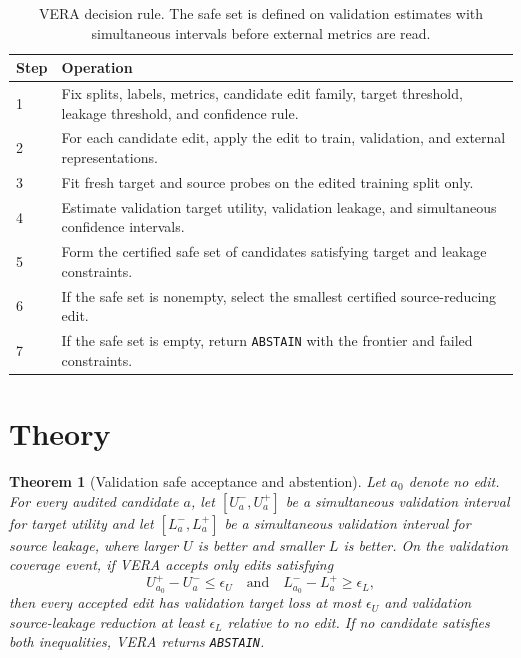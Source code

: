 \documentclass[10pt,twocolumn]{article}
\newtheorem{theorem}{Theorem}
\begin{document}
\begin{table}[t]
\centering
\caption{VERA decision rule. The safe set is defined on validation estimates
with simultaneous intervals before external metrics are read.}
\label{tab:algorithm}
\begin{tabular}{@{}p{}p{}@{}}
\toprule
Step & Operation \\
\midrule
1 & Fix splits, labels, metrics, candidate edit family, target threshold, leakage threshold, and confidence rule. \\
2 & For each candidate edit, apply the edit to train, validation, and external representations. \\
3 & Fit fresh target and source probes on the edited training split only. \\
4 & Estimate validation target utility, validation leakage, and simultaneous confidence intervals. \\
5 & Form the certified safe set of candidates satisfying target and leakage constraints. \\
6 & If the safe set is nonempty, select the smallest certified source-reducing edit. \\
7 & If the safe set is empty, return \texttt{ABSTAIN} with the frontier and failed constraints. \\
\bottomrule
\end{tabular}
\end{table}

\section{Theory}

\begin{theorem}[Validation safe acceptance and abstention]
Let $a_0$ denote no edit. For every audited candidate $a$, let
$[U^-_a,U^+_a]$ be a simultaneous validation interval for target utility and
let $[L^-_a,L^+_a]$ be a simultaneous validation interval for source leakage,
where larger $U$ is better and smaller $L$ is better. On the validation
coverage event, if VERA accepts only edits satisfying
\[
U^+_{a_0}-U^-_a \le \epsilon_U
\quad\textrm{and}\quad
L^-_{a_0}-L^+_a \ge \epsilon_L ,
\]
then every accepted edit has validation target loss at most $\epsilon_U$ and
validation source-leakage reduction at least $\epsilon_L$ relative to no edit.
If no candidate satisfies both inequalities, VERA returns \texttt{ABSTAIN}.
\end{theorem}
\end{document}
